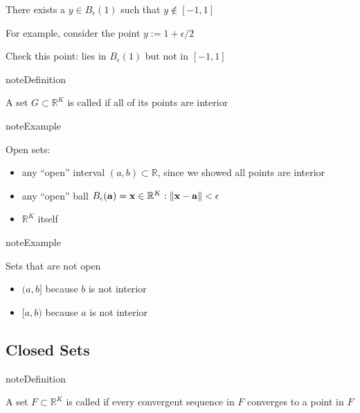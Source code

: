 \documentclass[letterpaper,10pt,english]{jupyterBook}
\begin{document}
\sphinxAtStartPar
There exists a \(y \in B_\epsilon(1)\) such that \(y \notin [-1, 1]\)

\sphinxAtStartPar
For example, consider the point \(y := 1 + \epsilon/2\)

\sphinxAtStartPar
{} Check this point: lies in \(B_\epsilon(1)\) but not in \([-1, 1]\)

\begin{sphinxadmonition}{note}{Definition}

\sphinxAtStartPar
A set \(G\subset \mathbb{R}^K\) is called  if all of its points are interior
\end{sphinxadmonition}

\begin{sphinxadmonition}{note}{Example}

\sphinxAtStartPar
Open sets:
\begin{itemize}
\item {} 
\sphinxAtStartPar
any “open” interval \((a,b) \subset \mathbb{R}\), since we showed all points are interior

\item {} 
\sphinxAtStartPar
any “open” ball \(B_\epsilon({\bf a}) = {\bf x} \in
\mathbb{R}^K : \|{\bf x} - {\bf a} \| < \epsilon\)

\item {} 
\sphinxAtStartPar
\(\mathbb{R}^K\) itself

\end{itemize}
\end{sphinxadmonition}

\begin{sphinxadmonition}{note}{Example}

\sphinxAtStartPar
Sets that are not open
\begin{itemize}
\item {} 
\sphinxAtStartPar
\((a,b]\) because \(b\) is not interior

\item {} 
\sphinxAtStartPar
\([a,b)\) because \(a\) is not interior

\end{itemize}
\end{sphinxadmonition}


\subsection{Closed Sets}
\label{\detokenize{04.basic_analysis:closed-sets}}
\begin{sphinxadmonition}{note}{Definition}

\sphinxAtStartPar
A set \(F \subset \mathbb{R}^K\) is called  if every convergent sequence in \(F\) converges to a point in \(F\)
\end{sphinxadmonition}
\end{document}
